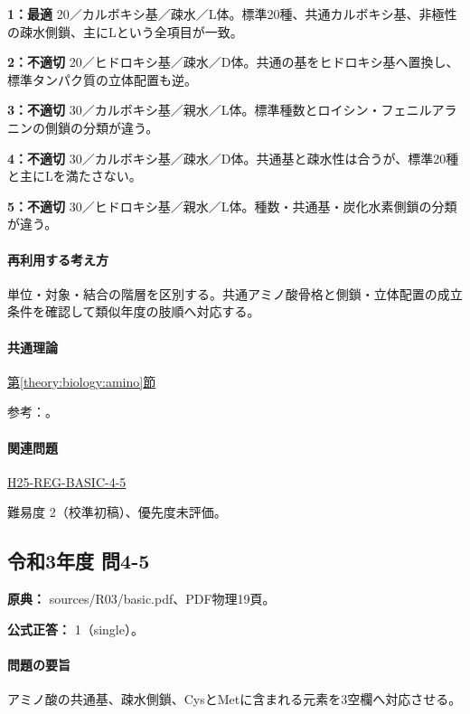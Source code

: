 \noindent\textbf{1：最適} 20／カルボキシ基／疎水／L体。標準20種、共通カルボキシ基、非極性の疎水側鎖、主にLという全項目が一致。\par

\noindent\textbf{2：不適切} 20／ヒドロキシ基／疎水／D体。共通の基をヒドロキシ基へ置換し、標準タンパク質の立体配置も逆。\par

\noindent\textbf{3：不適切} 30／カルボキシ基／親水／L体。標準種数とロイシン・フェニルアラニンの側鎖の分類が違う。\par

\noindent\textbf{4：不適切} 30／カルボキシ基／疎水／D体。共通基と疎水性は合うが、標準20種と主にLを満たさない。\par

\noindent\textbf{5：不適切} 30／ヒドロキシ基／親水／L体。種数・共通基・炭化水素側鎖の分類が違う。\par

\paragraph{再利用する考え方} 単位・対象・結合の階層を区別する。共通アミノ酸骨格と側鎖・立体配置の成立条件を確認して類似年度の肢順へ対応する。

\paragraph{共通理論} \hyperref[theory:biology:amino]{第\ref*{theory:biology:amino}節}

\par 参考：\cite{mit_amino}。

\paragraph{関連問題} \hyperref[q:h25-reg-basic-4-5]{H25-REG-BASIC-4-5}

\par 難易度 2（校準初稿）、優先度未評価。

\subsection{令和3年度 問4-5}
\label{q:r03-reg-basic-4-5}

\noindent\textbf{原典：} sources/R03/basic.pdf、PDF物理19頁。

\textbf{公式正答：} 1（single）。

\paragraph{問題の要旨} アミノ酸の共通基、疎水側鎖、CysとMetに含まれる元素を3空欄へ対応させる。

